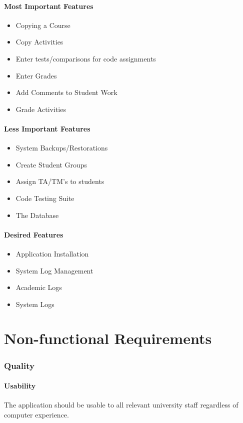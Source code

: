 \documentclass{article}
\begin{document}
\subsection{Most Important Features}
\begin{itemize}
  \item Copying a Course
  \item Copy Activities
  \item Enter tests/comparisons for code assignments
  \item Enter Grades
  \item Add Comments to Student Work
  \item Grade Activities
\end{itemize}

\subsection{Less Important Features}
\begin{itemize}
  \item System Backups/Restorations
  \item Create Student Groups
  \item Assign TA/TM's to students
  \item Code Testing Suite
  \item The Database
\end{itemize}

\subsection{Desired Features}
\begin{itemize}
  \item Application Installation
  \item System Log Management
  \item Academic Logs
  \item System Logs
\end{itemize}

\part{Non-functional Requirements}
\section{Quality}
\subsection{Usability}
The application should be usable to all relevant university staff
regardless of computer experience.
\end{document}

